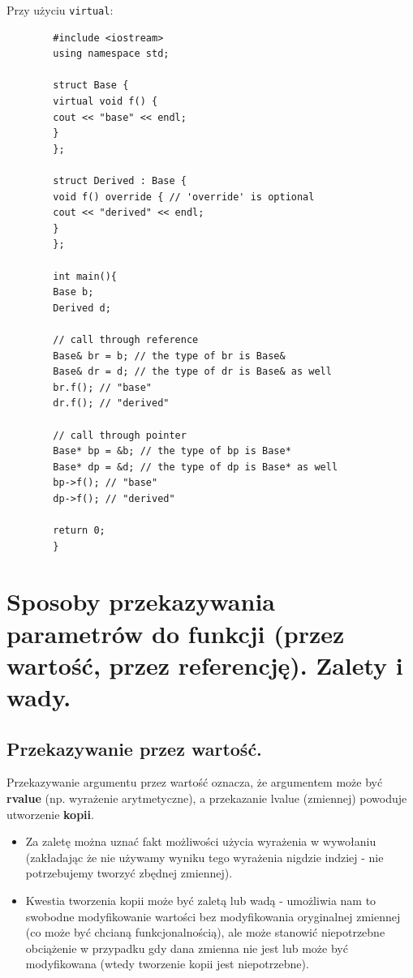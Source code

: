 \documentclass[12pt]{article}
\begin{document}
    Przy użyciu \texttt{virtual}:
    \begin{verbatim}
        #include <iostream>
        using namespace std;

        struct Base {
        virtual void f() {
        cout << "base" << endl;
        }
        };

        struct Derived : Base {
        void f() override { // 'override' is optional
        cout << "derived" << endl;
        }
        };

        int main(){
        Base b;
        Derived d;

        // call through reference
        Base& br = b; // the type of br is Base&
        Base& dr = d; // the type of dr is Base& as well
        br.f(); // "base"
        dr.f(); // "derived"

        // call through pointer
        Base* bp = &b; // the type of bp is Base*
        Base* dp = &d; // the type of dp is Base* as well
        bp->f(); // "base"
        dp->f(); // "derived"

        return 0;
        }
    \end{verbatim}

    \newpage

    \section{Sposoby przekazywania parametrów do funkcji (przez wartość, przez referencję). Zalety i wady.}

    \subsection{Przekazywanie przez wartość.}

    Przekazywanie argumentu przez wartość oznacza, że argumentem może być \textbf{rvalue} (np. wyrażenie arytmetyczne), a przekazanie
    lvalue (zmiennej) powoduje utworzenie \textbf{kopii}.
    \begin{itemize}
        \item Za zaletę można uznać fakt możliwości użycia wyrażenia w wywołaniu (zakładając że nie używamy wyniku tego
        wyrażenia nigdzie indziej - nie potrzebujemy tworzyć zbędnej zmiennej).
        \item Kwestia tworzenia kopii może być zaletą lub wadą - umożliwia nam to swobodne modyfikowanie wartości
        bez modyfikowania oryginalnej zmiennej (co może być chcianą funkcjonalnością), ale może stanowić niepotrzebne obciążenie
        w przypadku gdy dana zmienna nie jest lub może być modyfikowana (wtedy tworzenie kopii jest niepotrzebne).
    \end{itemize}
\end{document}
